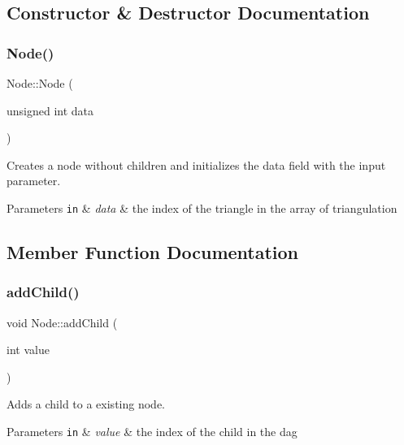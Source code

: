 \subsection{Constructor \& Destructor Documentation}
\mbox{\label{classNode_ad7349a128f40ad388aad4794d57ebbac}} 
\subsubsection{\texorpdfstring{Node()}{Node()}}
{\footnotesize\ttfamily Node\+::\+Node (\begin{DoxyParamCaption}\item[{unsigned int}]{data }\end{DoxyParamCaption})}



Creates a node without children and initializes the data field with the input parameter. 


\begin{DoxyParams}[1]{Parameters}
\mbox{\tt in}  & {\em data} & the index of the triangle in the array of triangulation \\
\hline
\end{DoxyParams}


\subsection{Member Function Documentation}
\mbox{\label{classNode_abcb65bc062925a1e35bd26c4491c1f08}} 
\subsubsection{\texorpdfstring{add\+Child()}{addChild()}}
{\footnotesize\ttfamily void Node\+::add\+Child (\begin{DoxyParamCaption}\item[{int}]{value }\end{DoxyParamCaption})}



Adds a child to a existing node. 


\begin{DoxyParams}[1]{Parameters}
\mbox{\tt in}  & {\em value} & the index of the child in the dag \\
\hline
\end{DoxyParams}
\mbox{\label{classNode_a9c32461ac040d49aff5d25b41b0353a7}} 

